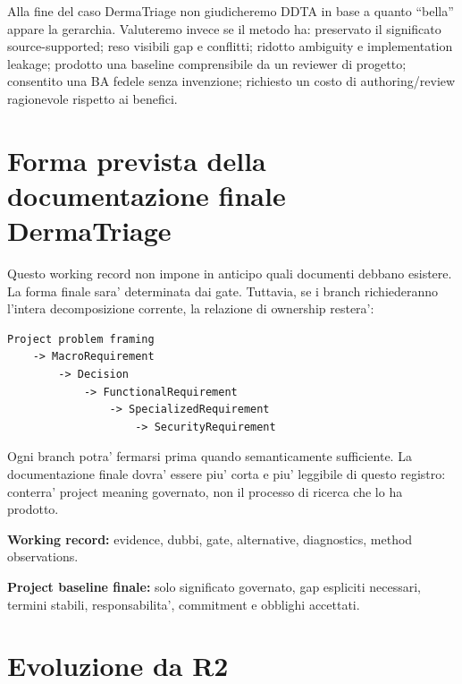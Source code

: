 \documentclass[11pt,a4paper]{article}
\begin{document}
\begin{ddtaworking}[title={Criterio per la valutazione finale della metodologia}]
Alla fine del caso DermaTriage non giudicheremo DDTA in base a quanto ``bella'' appare la gerarchia. Valuteremo invece se il metodo ha: preservato il significato source-supported; reso visibili gap e conflitti; ridotto ambiguity e implementation leakage; prodotto una baseline comprensibile da un reviewer di progetto; consentito una BA fedele senza invenzione; richiesto un costo di authoring/review ragionevole rispetto ai benefici.
\end{ddtaworking}

\section{Forma prevista della documentazione finale DermaTriage}

Questo working record non impone in anticipo quali documenti debbano esistere. La forma finale sara' determinata dai gate. Tuttavia, se i branch richiederanno l'intera decomposizione corrente, la relazione di ownership restera':

\begin{lstlisting}
Project problem framing
    -> MacroRequirement
        -> Decision
            -> FunctionalRequirement
                -> SpecializedRequirement
                    -> SecurityRequirement
\end{lstlisting}

Ogni branch potra' fermarsi prima quando semanticamente sufficiente. La documentazione finale dovra' essere piu' corta e piu' leggibile di questo registro: conterra' project meaning governato, non il processo di ricerca che lo ha prodotto.

\begin{ddtaprinciple}[title={Working record vs project baseline}]
\textbf{Working record:} evidence, dubbi, gate, alternative, diagnostics, method observations.\par
\textbf{Project baseline finale:} solo significato governato, gap espliciti necessari, termini stabili, responsabilita', commitment e obblighi accettati.
\end{ddtaprinciple}

\section{Evoluzione da R2}
\end{document}
